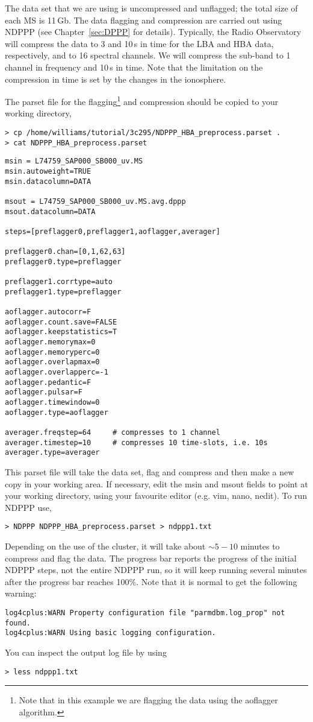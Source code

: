The data set that we are using is uncompressed and unflagged; the total size of each MS is 11\,Gb. The data flagging and compression are carried out using NDPPP (see Chapter~\ref{sec:DPPP} for details). Typically, the Radio Observatory will compress the data to 3 and 10\,s in time for the LBA and HBA data, respectively, and to 16 spectral channels. We will compress the sub-band to 1 channel in frequency and 10\,s in time. Note that the limitation on the compression in time is set by the changes in the ionosphere. 

The parset file for the flagging\footnote{Note that in this example we are flagging the data using the aoflagger algorithm.} and compression should be copied to your working directory,
\begin{verbatim}
> cp /home/williams/tutorial/3c295/NDPPP_HBA_preprocess.parset .
> cat NDPPP_HBA_preprocess.parset
\end{verbatim}
\begin{lstlisting}
msin = L74759_SAP000_SB000_uv.MS
msin.autoweight=TRUE
msin.datacolumn=DATA

msout = L74759_SAP000_SB000_uv.MS.avg.dppp
msout.datacolumn=DATA

steps=[preflagger0,preflagger1,aoflagger,averager]

preflagger0.chan=[0,1,62,63]
preflagger0.type=preflagger

preflagger1.corrtype=auto
preflagger1.type=preflagger

aoflagger.autocorr=F
aoflagger.count.save=FALSE
aoflagger.keepstatistics=T
aoflagger.memorymax=0
aoflagger.memoryperc=0
aoflagger.overlapmax=0
aoflagger.overlapperc=-1
aoflagger.pedantic=F
aoflagger.pulsar=F
aoflagger.timewindow=0
aoflagger.type=aoflagger

averager.freqstep=64     # compresses to 1 channel
averager.timestep=10     # compresses 10 time-slots, i.e. 10s
averager.type=averager
\end{lstlisting}

This parset file will take the data set, flag and compress and then make a new copy in your working area. If necessary, edit the msin and msout fields to point at your working directory, using your favourite editor (e.g. vim, nano, nedit). To run NDPPP use,
\begin{verbatim}
> NDPPP NDPPP_HBA_preprocess.parset > ndppp1.txt
\end{verbatim}

Depending on the use of the cluster, it will take about $\sim5-10$ minutes to compress and flag the data. The progress bar reports the progress of the initial NDPPP steps, not the entire NDPPP run, so it will keep running several minutes after the progress bar reaches 100\%. Note that it is normal to get the following warning:
\begin{verbatim}
log4cplus:WARN Property configuration file "parmdbm.log_prop" not found.
log4cplus:WARN Using basic logging configuration.
\end{verbatim} 
You can inspect the output log file by using
\begin{verbatim}
> less ndppp1.txt
\end{verbatim}

